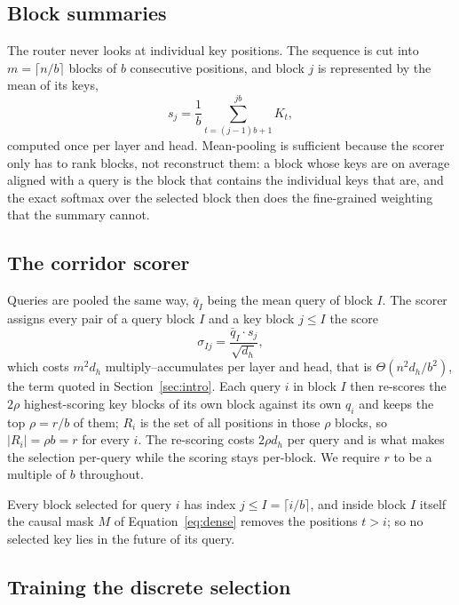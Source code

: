 \documentclass[11pt]{article}
\begin{document}
\subsection{Block summaries}\label{sec:summaries}

The router never looks at individual key positions. The sequence is cut into
$m = \lceil n/b \rceil$ blocks of $b$ consecutive positions, and block $j$ is
represented by the mean of its keys,
\begin{equation}\label{eq:summary}
  s_j = \frac{1}{b} \sum_{t=(j-1)b+1}^{jb} K_t ,
\end{equation}
computed once per layer and head. Mean-pooling is sufficient because the
scorer only has to rank blocks, not reconstruct them: a block whose keys are
on average aligned with a query is the block that contains the individual
keys that are, and the exact softmax over the selected block then does the
fine-grained weighting that the summary cannot.

\subsection{The corridor scorer}\label{sec:scorer}

Queries are pooled the same way, $\bar{q}_I$ being the mean query of block
$I$. The scorer assigns every pair of a query block $I$ and a key block
$j \le I$ the score
\begin{equation}\label{eq:score}
  \sigma_{Ij} = \frac{\bar{q}_I \cdot s_j}{\sqrt{d_h}} ,
\end{equation}
which costs $m^2 d_h$ multiply--accumulates per layer and head, that is
$\Theta(n^2 d_h / b^2)$, the term quoted in Section~\ref{sec:intro}. Each
query $i$ in block $I$ then re-scores the $2\rho$ highest-scoring key blocks
of its own block against its own $q_i$ and keeps the top $\rho = r/b$ of
them; $R_i$ is the set of all positions in those $\rho$ blocks, so
$|R_i| = \rho b = r$ for every $i$. The re-scoring costs $2\rho d_h$ per
query and is what makes the selection per-query while the scoring stays
per-block. We require $r$ to be a multiple of $b$ throughout.

Every block selected for query $i$ has index $j \le I = \lceil i/b \rceil$,
and inside block $I$ itself the causal mask $M$ of Equation~\eqref{eq:dense}
removes the positions $t > i$; so no selected key lies in the future of its
query.

\subsection{Training the discrete selection}\label{sec:training}
\end{document}

